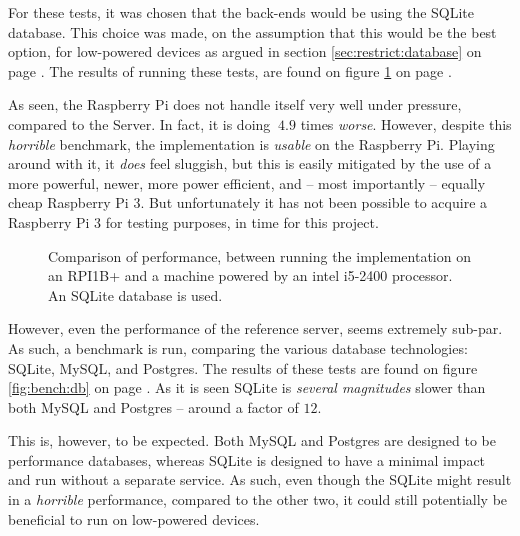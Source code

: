 	For these tests, it was chosen that the back-ends would be using the SQLite database. This choice was made, on the assumption that this would be the best option, for low-powered devices as argued in section \ref{sec:restrict:database} on page \pageref{sec:restrict:database}. The results of running these tests, are found on figure \ref{fig:bench:arch} on page \pageref{fig:bench:arch}. 

	As seen, the Raspberry Pi does not handle itself very well under pressure, compared to the Server. In fact, it is doing $~4.9$ times \emph{worse}. However, despite this \emph{horrible} benchmark, the implementation is \emph{usable} on the Raspberry Pi. Playing around with it, it \emph{does} feel sluggish, but this is easily mitigated by the use of a more powerful, newer, more power efficient, and -- most importantly -- equally cheap Raspberry Pi 3. But unfortunately it has not been possible to acquire a Raspberry Pi 3 for testing purposes, in time for this project.

	\begin{figure}[!h]
		\centering
	    \caption{Comparison of performance, between running the implementation on an RPI1B+ and a machine powered by an intel i5-2400 processor. An SQLite database is used.}
	    \label{fig:bench:arch}
	\end{figure}

	However, even the performance of the reference server, seems extremely sub-par. As such, a benchmark is run, comparing the various database technologies: SQLite, MySQL, and Postgres. The results of these tests are found on figure \ref{fig:bench:db} on page \pageref{fig:bench:db}. As it is seen SQLite is \emph{several magnitudes} slower than both MySQL and Postgres -- around a factor of $12$.

	This is, however, to be expected. Both MySQL and Postgres are designed to be performance databases, whereas SQLite is designed to have a minimal impact and run without a separate service. As such, even though the SQLite might result in a \emph{horrible} performance, compared to the other two, it could still potentially be beneficial to run on low-powered devices.

